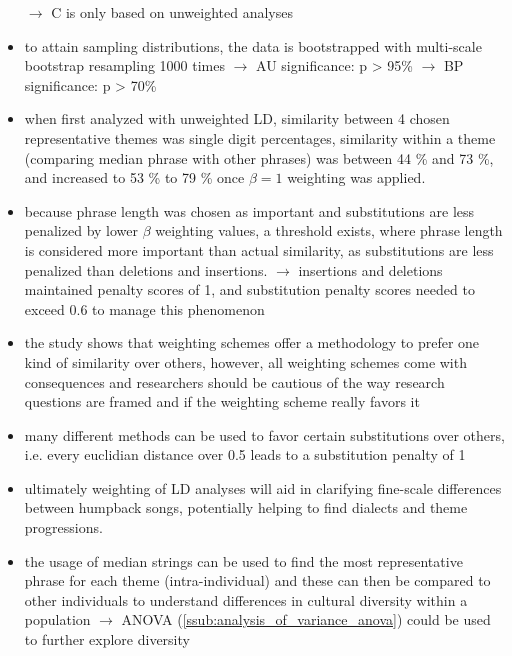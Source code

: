\documentclass[12pt,a4paper]{article}
\begin{document}
\begin{itemize}
\begin{enumerate}[A]
   \end{enumerate}
  \indent $\longrightarrow$ C is only based on unweighted analyses
    \item to attain sampling distributions, the data is bootstrapped with multi-scale bootstrap resampling 1000 times
    \newline \indent $\longrightarrow$ AU significance: p > 95\%
    \newline \indent $\longrightarrow$ BP significance: p > 70\%
    \item when first analyzed with unweighted LD, similarity between 4 chosen representative themes was single digit percentages, similarity within a theme (comparing median phrase with other phrases) was between 44 \% and 73 \%, and increased to 53 \% to 79 \% once $\beta=1$ weighting was applied.
    \item because phrase length was chosen as important and substitutions are less penalized by lower $\beta$ weighting values, a threshold exists, where phrase length is considered more important than actual similarity, as substitutions are less penalized than deletions and insertions.
    \newline \indent $\longrightarrow$ insertions and deletions maintained penalty scores of 1, and substitution penalty scores needed to exceed 0.6 to manage this phenomenon
    \item the study shows that weighting schemes offer a methodology to prefer one kind of similarity over others, however, all weighting schemes come with consequences and researchers should be cautious of the way research questions are framed and if the weighting scheme really favors it
    \item many different methods can be used to favor certain substitutions over others, i.e. every euclidian distance over 0.5 leads to a substitution penalty of 1 
    \item ultimately weighting of LD analyses will aid in clarifying fine-scale differences between humpback songs, potentially helping to find dialects and theme progressions.
    \item the usage of median strings can be used to find the most representative phrase for each theme (intra-individual) and these can then be compared to other individuals to understand differences in cultural diversity within a population
    \newline \indent $\longrightarrow$ ANOVA (\ref{ssub:analysis_of_variance_anova}) could be used to further explore diversity
\end{itemize}
\end{document}
